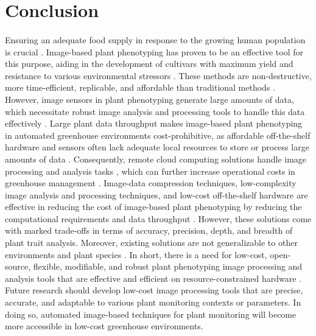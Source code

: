 \section{Conclusion}

\paragraph{}
Ensuring an adequate food supply in response to the growing human population is crucial \cite{carvajal-yepesGlobalSurveillanceSystem2019}. Image-based plant phenotyping has proven to be an effective tool for this purpose, aiding in the development of cultivars with maximum yield and resistance to various environmental stressors \cite{anandBreedingTechniquesDispense2023}. These methods are non-destructive, more time-efficient, replicable, and affordable than traditional methods \cite{daschoudhuryLeveragingImageAnalysis2019}. However, image sensors in plant phenotyping generate large amounts of data, which necessitate robust image analysis and processing tools to handle this data effectively \cite{gomesComputationalSustainabilityComputational2009}. Large plant data throughput makes image-based plant phenotyping in automated greenhouse environments cost-prohibitive, as affordable off-the-shelf hardware and sensors often lack adequate local resources to store or process large amounts of data \cite{bauckhageDataMiningPattern2013}. Consequently, remote cloud computing solutions handle image processing and analysis tasks \cite{debaucheCloudArchitecturePlant2020}, which can further increase operational costs in greenhouse management \cite{minerviniImageAnalysisNew2015}. Image-data compression techniques, low-complexity image analysis and processing techniques, and low-cost off-the-shelf hardware are effective in reducing the cost of image-based plant phenotyping by reducing the computational requirements and data throughput \cite{minerviniApplicationawareImageCompression2013, tovarRaspberryPiPowered2018a, minerviniImageAnalysisNew2015}. However, these solutions come with marked trade-offs in terms of accuracy, precision, depth, and breadth of plant trait analysis. Moreover, existing solutions are not generalizable to other environments and plant species \cite{arnalbarbedoDigitalImageProcessing2013, liReviewImagingTechniques2014}. In short, there is a need for low-cost, open-source, flexible, modifiable, and robust plant phenotyping image processing and analysis tools that are effective and efficient on resource-constrained hardware \cite{minerviniImageAnalysisNew2015}. Future research should develop low-cost image processing tools that are precise, accurate, and adaptable to various plant monitoring contexts or parameters. In doing so, automated image-based techniques for plant monitoring will become more accessible in low-cost greenhouse environments.